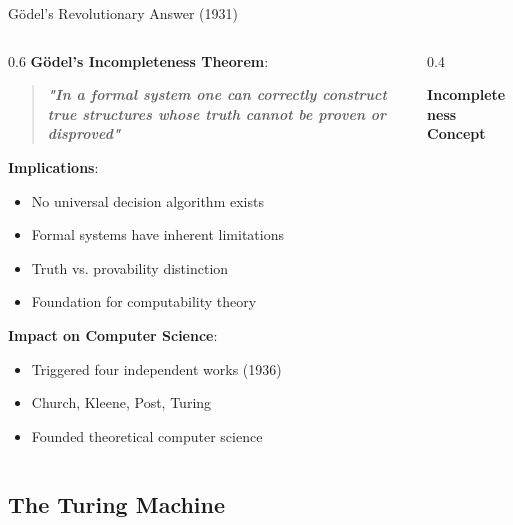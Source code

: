 \documentclass[aspectratio=169]{beamer}
\newcommand{\concept}[1]{\textbf{\color{darkblue}#1}}
\begin{document}
\begin{frame}{Gödel's Revolutionary Answer (1931)}
\begin{columns}
\begin{column}{0.6\textwidth}
\concept{Gödel's Incompleteness Theorem}:
\begin{quote}
\textbf{\textit{"In a formal system one can correctly construct true structures whose truth cannot be proven or disproved"}}
\end{quote}

\vspace{0.3cm}
\concept{Implications}:
\begin{itemize}
\item No universal decision algorithm exists
\item Formal systems have inherent limitations
\item Truth vs. provability distinction
\item Foundation for computability theory
\end{itemize}

\vspace{0.3cm}
\concept{Impact on Computer Science}:
\begin{itemize}
\item Triggered four independent works (1936)
\item Church, Kleene, Post, Turing
\item Founded theoretical computer science
\end{itemize}
\end{column}
\begin{column}{0.4\textwidth}
\begin{center}
\textbf{Incompleteness Concept}
\vspace{0.3cm}

\end{center}
\end{column}
\end{columns}
\end{frame}

\subsection{The Turing Machine}
\end{document}

